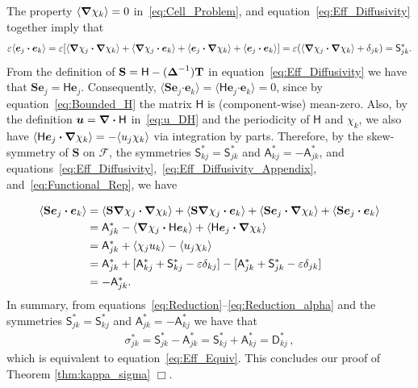 \documentclass[leqno,onefignum,onetabnum]{siamltex1213}
\newcommand{\Tb}{\mathbf{T}}
\newcommand{\Sb}{\mathbf{S}}
\newcommand{\Fc}{\mathcal{F}}
\newcommand{\Dm}{\mathsf{D}}
\newcommand{\Hm}{\mathsf{H}}
\newcommand{\Sm}{\mathsf{S}}
\newcommand{\Am}{\mathsf{A}}
\newcommand\bDelta{\mbox{\boldmath${\Delta}$}}
\newcommand\bnabla{\mbox{\boldmath${\nabla}$}}
\providecommand\bcdot{\boldsymbol{\cdot}}
\newcommand{\vecu}{\boldsymbol{u}}
\newcommand{\vece}{\boldsymbol{e}}
\begin{document}
The property  $\langle\bnabla \chi_k\rangle=0$ in~\eqref{eq:Cell_Problem}, and
equation~\eqref{eq:Eff_Diffusivity} together imply that  
%
\begin{align}\label{eq:Reduction_kappa}
  \varepsilon\langle\vece _j\bcdot\vece _k\rangle=\varepsilon[\langle\bnabla \chi_j\bcdot\bnabla \chi_k\rangle
                   +\langle\bnabla \chi_j\bcdot\vece _k\rangle+\langle\vece _j\bcdot\bnabla \chi_k\rangle
                   +\langle\vece _j\bcdot\vece _k\rangle]
                   =\varepsilon(\langle\bnabla \chi_j\bcdot\bnabla \chi_k\rangle+\delta_{jk})
                   =\Sm^*_{jk}. 
\end{align}
%
From the definition of $\Sb=\Hm-(\bDelta^{-1})\Tb$ in
equation~\eqref{eq:Eff_Diffusivity} we have that 
$\Sb\vece _j=\Hm\vece _j$. Consequently,
$\langle\Sb\vece _j\bcdot\vece _k\rangle=\langle\Hm\vece _j\bcdot\vece _k\rangle=0$, since by 
equation~\eqref{eq:Bounded_H} the matrix $\Hm$ is (component-wise)
mean-zero. Also, by the definition $\vecu =\bnabla \bcdot\Hm$
in~\eqref{eq:u_DH} and the periodicity of $\Hm$ and $\chi_k$, we also
have 
$\langle\Hm\vece _j\bcdot\bnabla \chi_k\rangle=-\langle u_j\chi_k\rangle$ via integration by
parts. Therefore, by the skew-symmetry of $\Sb$ on $\Fc$, the
symmetries $\Sm^*_{kj}=\Sm^*_{jk}$ and $\Am^*_{kj}=-\Am^*_{jk}$, and
equations~\eqref{eq:Eff_Diffusivity},~\eqref{eq:Eff_Diffusivity_Appendix},
and~\eqref{eq:Functional_Rep}, we have 


%
\begin{align}\label{eq:Reduction_alpha}    
   \langle\Sb\vece _j\bcdot\vece _k\rangle&=\langle\Sb\bnabla \chi_j\bcdot\bnabla \chi_k\rangle
                       +\langle\Sb\bnabla \chi_j\bcdot\vece _k\rangle+\langle\Sb\vece _j\bcdot\bnabla \chi_k\rangle
                       +\langle\Sb\vece _j\bcdot\vece _k\rangle
                       \\
                       &=\Am^*_{jk}-\langle\bnabla \chi_j\bcdot\Hm\vece _k\rangle+\langle\Hm\vece _j\bcdot\bnabla \chi_k\rangle
                       \notag\\
                       &=\Am^*_{jk}+\langle\chi_ju_k\rangle-\langle u_j\chi_k\rangle
                       \notag\\
                       &=\Am^*_{jk}+[\Am^*_{kj}+\Sm^*_{kj}-\varepsilon\delta_{kj}]-[\Am^*_{jk}+\Sm^*_{jk}-\varepsilon\delta_{jk}]
                       \notag\\
                       &=-\Am^*_{jk}.
                       \notag
\end{align}
%
In summary, from
equations~\eqref{eq:Reduction}--\eqref{eq:Reduction_alpha} and the 
symmetries $\Sm^*_{jk}=\Sm^*_{kj}$ and $\Am^*_{jk}=-\Am^*_{kj}$ we have that 
%
\begin{align}\label{eq:Reduction_final}
  \sigma^*_{jk}=\Sm^*_{jk}-\Am^*_{jk}=\Sm^*_{kj}+\Am^*_{kj}=\Dm_{kj}^*\,,       
\end{align}
%
which is equivalent to equation~\eqref{eq:Eff_Equiv}. This concludes
our proof of Theorem \ref{thm:kappa_sigma} $\Box$.     
\end{document}
